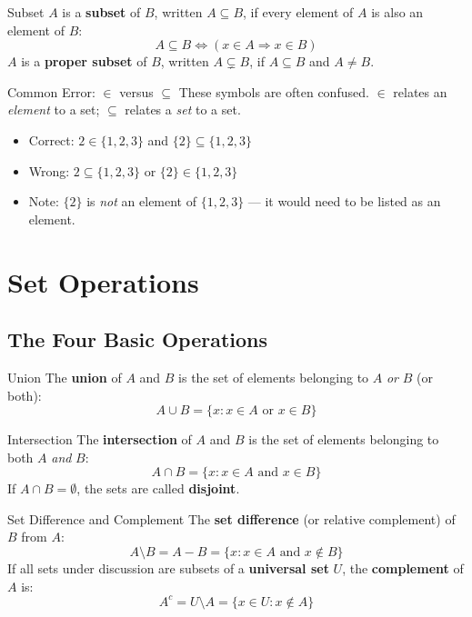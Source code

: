 \documentclass[12pt, a4paper]{article}
\theoremstyle{definition}
\begin{document}
\begin{defbox}{Subset}
$A$ is a \textbf{subset} of $B$, written $A \subseteq B$, if every element of $A$ is also an element of $B$:
\[
  A \subseteq B \iff (x \in A \Rightarrow x \in B)
\]
$A$ is a \textbf{proper subset} of $B$, written $A \subsetneq B$, if $A \subseteq B$ and $A \neq B$.
\end{defbox}

\begin{warnbox}{Common Error: $\in$ versus $\subseteq$}
These symbols are often confused. $\in$ relates an \emph{element} to a set; $\subseteq$ relates a \emph{set} to a set.
\begin{itemize}
  \item Correct: $2 \in \{1, 2, 3\}$ and $\{2\} \subseteq \{1, 2, 3\}$
  \item Wrong: $2 \subseteq \{1,2,3\}$ or $\{2\} \in \{1,2,3\}$
  \item Note: $\{2\}$ is \textit{not} an element of $\{1,2,3\}$ --- it would need to be listed as an element.
\end{itemize}
\end{warnbox}



\section{Set Operations}

\subsection{The Four Basic Operations}

\begin{defbox}{Union}
The \textbf{union} of $A$ and $B$ is the set of elements belonging to $A$ \emph{or} $B$ (or both):
\[
  A \cup B = \{x : x \in A \text{ or } x \in B\}
\]
\end{defbox}

\begin{defbox}{Intersection}
The \textbf{intersection} of $A$ and $B$ is the set of elements belonging to both $A$ \emph{and} $B$:
\[
  A \cap B = \{x : x \in A \text{ and } x \in B\}
\]
If $A \cap B = \emptyset$, the sets are called \textbf{disjoint}.
\end{defbox}

\begin{defbox}{Set Difference and Complement}
The \textbf{set difference} (or relative complement) of $B$ from $A$:
\[
  A \setminus B = A - B = \{x : x \in A \text{ and } x \notin B\}
\]
If all sets under discussion are subsets of a \textbf{universal set} $U$, the \textbf{complement} of $A$ is:
\[
  A^c = U \setminus A = \{x \in U : x \notin A\}
\]
\end{defbox}
\end{document}
